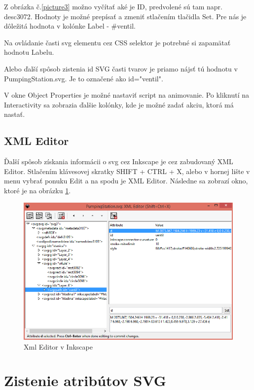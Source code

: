 Z obrázka č.\ref{picture3} možno vyčítať aké je ID, predvolené sú tam napr. desc3072. Hodnoty je možné prepísať a zmeniť stlačením tlačidla Set. Pre nás je dôležitá hodnota v kolónke Label - \#ventil. 

Na ovládanie časti svg elementu cez CSS selektor je potrebné si zapamätať hodnotu Labelu.  %

Alebo ďalší spôsob zistenia id SVG časti tvarov je priamo nájsť tú hodnotu v PumpingStation.svg. Je to označené ako id="ventil".

V okne Object Properties je možné nastaviť script na animovanie. Po kliknutí na Interactivity sa zobrazia ďalšie kolónky, kde je možné zadať akciu, ktorá má nastať.  



\subsection{XML Editor}
Ďalší spôsob získania informácii o svg cez Inkscape je cez zabudovaný XML Editor.
Stlačením klávesovej skratky SHIFT + CTRL + X, alebo v hornej lište v menu vybrať ponuku Edit a na spodu je XML Editor. Následne sa zobrazí okno, ktoré je na obrázku \ref{xmlEditor}.
\begin{figure}[H]
	\begin{center}
		\includegraphics[width=0.7\linewidth]  {obrazky/XmlEditor2.png}
		\caption{Xml Editor v Inkscape}
		\label{xmlEditor}
	\end{center}
\end{figure}


\section{Zistenie atribútov SVG}

